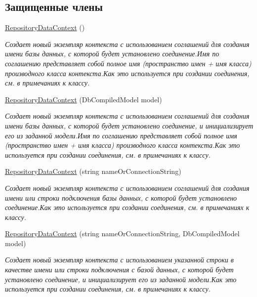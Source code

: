\subsection*{Защищенные члены}
\begin{DoxyCompactItemize}
\item 
\hyperlink{class_security_1_1_entity_dal_1_1_base_1_1_repository_data_context_a31dac417f97f23f2f604306682e13c7d}{Repository\+Data\+Context} ()
\begin{DoxyCompactList}\small\item\em Создает новый экземпляр контекста с использованием соглашений для создания имени базы данных, с которой будет установлено соединение.\+Имя по соглашению представляет собой полное имя (пространство имен + имя класса) производного класса контекста.\+Как это используется при создании соединения, см. в примечаниях к классу. \end{DoxyCompactList}\item 
\hyperlink{class_security_1_1_entity_dal_1_1_base_1_1_repository_data_context_abe2285d215c5e1ecf7d1f80a511b771a}{Repository\+Data\+Context} (Db\+Compiled\+Model model)
\begin{DoxyCompactList}\small\item\em Создает новый экземпляр контекста с использованием соглашений для создания имени базы данных, с которой будет установлено соединение, и инициализирует его из заданной модели.\+Имя по соглашению представляет собой полное имя (пространство имен + имя класса) производного класса контекста.\+Как это используется при создании соединения, см. в примечаниях к классу. \end{DoxyCompactList}\item 
\hyperlink{class_security_1_1_entity_dal_1_1_base_1_1_repository_data_context_ae6e3c338a6998c7770cafedc4c6f4706}{Repository\+Data\+Context} (string name\+Or\+Connection\+String)
\begin{DoxyCompactList}\small\item\em Создает новый экземпляр контекста с использованием соглашений для создания имени или строки подключения базы данных, с которой будет установлено соединение.\+Как это используется при создании соединения, см. в примечаниях к классу. \end{DoxyCompactList}\item 
\hyperlink{class_security_1_1_entity_dal_1_1_base_1_1_repository_data_context_ac7983fdf9c6abc654fb960466636a1c2}{Repository\+Data\+Context} (string name\+Or\+Connection\+String, Db\+Compiled\+Model model)
\begin{DoxyCompactList}\small\item\em Создает новый экземпляр контекста с использованием указанной строки в качестве имени или строки подключения с базой данных, с которой будет установлено соединение, и инициализирует его из заданной модели.\+Как это используется при создании соединения, см. в примечаниях к классу. \end{DoxyCompactList}\item 

\end{DoxyCompactItemize}
